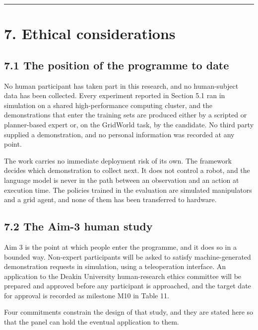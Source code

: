 \documentclass[
  11pt,
]{article}
\begin{document}
\begin{center}\rule{0.5\linewidth}{0.5pt}\end{center}

\hypertarget{ethical-considerations}{%
\section{7. Ethical considerations}\label{ethical-considerations}}

\hypertarget{the-position-of-the-programme-to-date}{%
\subsection{7.1 The position of the programme to
date}\label{the-position-of-the-programme-to-date}}

No human participant has taken part in this research, and no
human-subject data has been collected. Every experiment reported in
Section 5.1 ran in simulation on a shared high-performance computing
cluster, and the demonstrations that enter the training sets are
produced either by a scripted or planner-based expert or, on the
GridWorld task, by the candidate. No third party supplied a
demonstration, and no personal information was recorded at any point.

The work carries no immediate deployment risk of its own. The framework
decides which demonstration to collect next. It does not control a
robot, and the language model is never in the path between an
observation and an action at execution time. The policies trained in the
evaluation are simulated manipulators and a grid agent, and none of them
has been transferred to hardware.

\hypertarget{the-aim-3-human-study}{%
\subsection{7.2 The Aim-3 human study}\label{the-aim-3-human-study}}

Aim 3 is the point at which people enter the programme, and it does so
in a bounded way. Non-expert participants will be asked to satisfy
machine-generated demonstration requests in simulation, using a
teleoperation interface. An application to the Deakin University
human-research ethics committee will be prepared and approved before any
participant is approached, and the target date for approval is recorded
as milestone M10 in Table 11.

Four commitments constrain the design of that study, and they are stated
here so that the panel can hold the eventual application to them.
\end{document}
